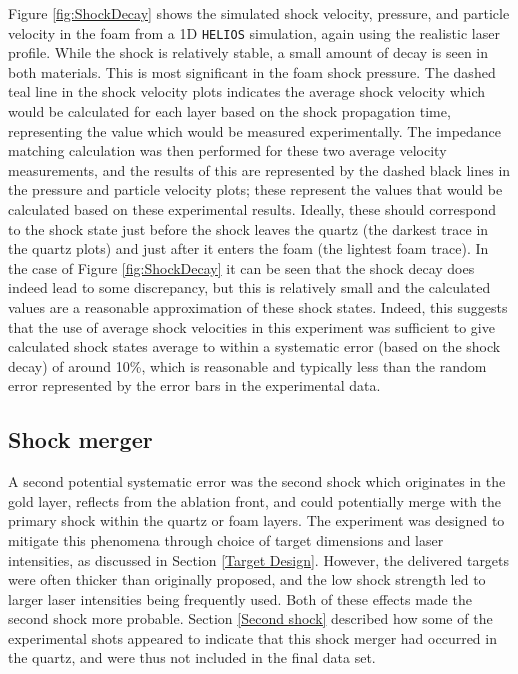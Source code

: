 Figure \ref{fig:ShockDecay} shows the simulated shock velocity, pressure, and particle velocity in the foam from a 1D \texttt{HELIOS} simulation, again using the realistic laser profile. While the shock is relatively stable, a small amount of decay is seen in both materials. This is most significant in the foam shock pressure. The dashed teal line in the shock velocity plots indicates the average shock velocity which would be calculated for each layer based on the shock propagation time, representing the value which would be measured experimentally. The impedance matching calculation was then performed for these two average velocity measurements, and the results of this are represented by the dashed black lines in the pressure and particle velocity plots; these represent the values that would be calculated based on these experimental results. Ideally, these should correspond to the shock state just before the shock leaves the quartz (the darkest trace in the quartz plots) and just after it enters the foam (the lightest foam trace). In the case of Figure \ref{fig:ShockDecay} it can be seen that the shock decay does indeed lead to some discrepancy, but this is relatively small and the calculated values are a reasonable approximation of these shock states. Indeed, this suggests that the use of average shock velocities in this experiment was sufficient to give calculated shock states average to within a systematic error (based on the shock decay) of around 10\%, which is reasonable and typically less than the random error represented by the error bars in the experimental data.

\subsection{Shock merger} \label{Shock merger}

A second potential systematic error was the second shock which originates in the gold layer, reflects from the ablation front, and could potentially merge with the primary shock within the quartz or foam layers. The experiment was designed to mitigate this phenomena through choice of target dimensions and laser intensities, as discussed in Section \ref{Target Design}. However, the delivered targets were often thicker than originally proposed, and the low shock strength led to larger laser intensities being frequently used. Both of these effects made the second shock more probable. Section \ref{Second shock} described how some of the experimental shots appeared to indicate that this shock merger had occurred in the quartz, and were thus not included in the final data set.

